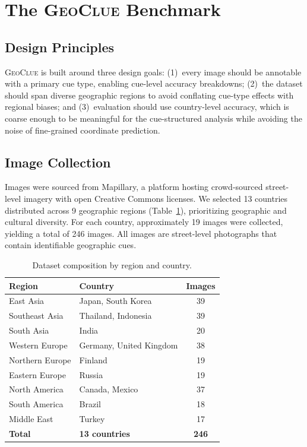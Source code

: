 \documentclass[twoside,11pt]{article}
\newcommand{\benchmark}{\textsc{GeoClue}}
\begin{document}
\section{The \benchmark{} Benchmark}
\label{sec:benchmark}

\subsection{Design Principles}

\benchmark{} is built around three design goals: (1)~every image should be annotable with a primary cue type, enabling cue-level accuracy breakdowns; (2)~the dataset should span diverse geographic regions to avoid conflating cue-type effects with regional biases; and (3)~evaluation should use country-level accuracy, which is coarse enough to be meaningful for the cue-structured analysis while avoiding the noise of fine-grained coordinate prediction.

\subsection{Image Collection}

Images were sourced from Mapillary, a platform hosting crowd-sourced street-level imagery with open Creative Commons licenses. We selected 13 countries distributed across 9 geographic regions (Table~\ref{tab:dataset}), prioritizing geographic and cultural diversity. For each country, approximately 19 images were collected, yielding a total of 246 images. All images are street-level photographs that contain identifiable geographic cues.

\begin{table}[t]
\caption{Dataset composition by region and country.}
\label{tab:dataset}
\centering
\small
\begin{tabular}{llc}
\toprule
\textbf{Region} & \textbf{Country} & \textbf{Images} \\
\midrule
East Asia & Japan, South Korea & 39 \\
Southeast Asia & Thailand, Indonesia & 39 \\
South Asia & India & 20 \\
Western Europe & Germany, United Kingdom & 38 \\
Northern Europe & Finland & 19 \\
Eastern Europe & Russia & 19 \\
North America & Canada, Mexico & 37 \\
South America & Brazil & 18 \\
Middle East & Turkey & 17 \\
\midrule
\textbf{Total} & \textbf{13 countries} & \textbf{246} \\
\bottomrule
\end{tabular}
\end{table}
\end{document}
